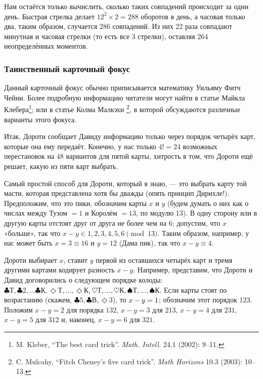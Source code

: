 Нам остаётся только вычислить, сколько таких совпадений происходит за один день.
Быстрая стрелка делает $12^2\times 2 = 288$ оборотов в день, а часовая только два, таким образом, случается 286 совпадений.
Из них 22 раза совпадают минутная и часовая стрелки (то есть все $3$ стрелки), оставляя 264 неопределённых моментов. 
\heart

\subsubsection*{Таинственный карточный фокус}%

Данный карточный фокус обычно приписывается математику Уильяму Фитч Чейни. %
Более подробную информацию читатели могут найти в статье Майкла Клебера\footnote{M. Kleber, ``The best card trick''. \emph{Math. Intell.} 24.1 (2002): 9--11.};
или в статье Колма Малкэхи%
\footnote{C. Mulcahy, ``Fitch Cheney's five card trick''. \emph{Math Horizons} 10.3 (2003): 10--13.}, в которой обсуждаются различные варианты этого фокуса.

\medskip

Итак, Дороти сообщает Давиду информацию только через порядок четырёх карт, которые она ему передаёт.
Конечно, у нас только $4!=24$ возможных перестановок на $48$ вариантов для пятой карты, хитрость в том, что Дороти ещё решает, какую из пяти карт выбрать.

Самый простой способ для Дороти, который я знаю, --- это выбрать карту той масти, которая представлена хотя бы дважды (опять принцип Дирихле!).
Предположим, что это пики, обозначим карты $x$ и $y$ (будем думать о них как о числах между Тузом $=1$ и Королём $=13$, по модулю 13).
В одну сторону или в другую карты отстоят друг от друга не более чем на 6;
допустим, что $x$ «больше», так что $x-y\in {1,2,3,4,5,6} \pmod{13}$.
Таким образом, например, у нас может быть $x =3\equiv 16$ и $y = 12$ (Дама пик), так что $x-y\equiv4$.

Дороти выбирает $x$, ставит $y$ первой из оставшихся четырёх карт и тремя другими картами кодирует разность $x-y$.
Например, представим, что Дороти и Давид договорились о следующем порядке колоды: 
$\clubsuit\text{Т},
\clubsuit 2,
\dots
\clubsuit\text{К},
\Diamond\text{Т},
\dots,
\Diamond\text{К},
\heartsuit\text{Т},
\dots,
\heartsuit\text{К},
\spadesuit \text{Т},
\dots,
\spadesuit \text{К}$.
Если карты стоят по возрастанию (скажем, 
$\clubsuit 5,
\clubsuit \text{В},
\Diamond 3$), то $x-y\z=1$; обозначим этот порядок $123$.
Положим $x-y=2$ для порядка $132$,
$x-y=3$ для $213$, $x-y=4$ для $231$, $x-y=5$ для $312$ и, наконец, $x-y=6$ для $321$.

